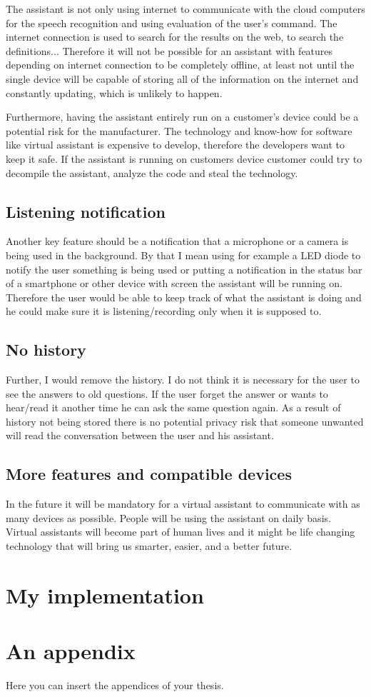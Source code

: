 \documentclass[
  digital, %
  oneside, %
  table,   %
  lof,     %
  lot,     %
]{fithesis3}
\begin{document}
The assistant is not only using internet to communicate with the cloud computers for the speech recognition and using evaluation of the user's command. The internet connection is used to search for the results on the web, to search the definitions... Therefore it will not be possible for an assistant with features depending on internet connection to be completely offline, at least not until the single device will be capable of storing all of the information on the internet and constantly updating, which is unlikely to happen.

Furthermore, having the assistant entirely run on a customer's device could be a potential risk for the manufacturer. The technology and know-how for software like virtual assistant is expensive to develop, therefore the developers want to keep it safe. If the assistant is running on customers device customer could try to decompile the assistant, analyze the code and steal the technology.

\section{Listening notification}
Another key feature should be a notification that a microphone or a camera is being used in the background. By that I mean using for example a LED diode to notify the user something is being used or putting a notification in the status bar of a smartphone or other device with screen the assistant will be running on. Therefore the user would be able to keep track of what the assistant is doing and he could make sure it is listening/recording only when it is supposed to.

\section{No history}
Further, I would remove the history. I do not think it is necessary for the user to see the answers to old questions. If the user forget the answer or wants to hear/read it another time he can ask the same question again. As a result of history not being stored there is no potential privacy risk that someone unwanted will read the conversation between the user and his assistant.

\section{More features and compatible devices}
In the future it will be mandatory for a virtual assistant to communicate with as many devices as possible. People will be using the assistant on daily basis. Virtual assistants will become part of human lives and it might be life changing technology that will bring us smarter, easier, and a better future.

\chapter{My implementation}


\printbibliography[heading=bibintoc] %


\appendix %

\chapter{An appendix}
Here you can insert the appendices of your thesis.
\end{document}
